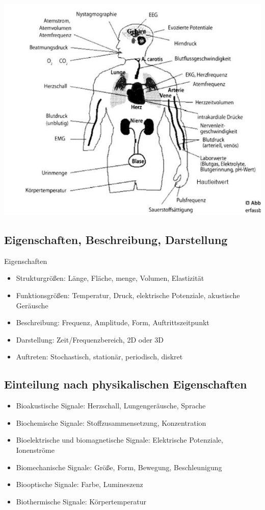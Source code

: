 \documentclass[a4paper,10pt,oneside]{article}
\begin{document}
\includegraphics[scale=0.65]{Grafiken/beispielbiosig.png}

\subsection{Eigenschaften, Beschreibung, Darstellung}
Eigenschaften
\begin{itemize}
	\item Strukturgrößen: Länge, Fläche, menge, Volumen, Elastizität
	\item Funktionsgrößen: Temperatur, Druck, elektrische Potenziale, akustische Geräusche
	\item Beschreibung: Frequenz, Amplitude, Form, Auftrittszeitpunkt
	\item Darstellung: Zeit/Frequenzbereich, 2D oder 3D
	\item Auftreten: Stochastisch, stationär, periodisch, diskret
\end{itemize}

\subsection{Einteilung nach physikalischen Eigenschaften}
\begin{itemize}
	\item Bioakustische Signale: Herzschall, Lungengeräusche, Sprache
	\item Biochemische Signale: Stoffzusammensetzung, Konzentration
	\item Bioelektrische und biomagnetische Signale: Elektrische Potenziale, Ionenströme
	\item Biomechanische Signale: Größe, Form, Bewegung, Beschleunigung
	\item Biooptische Signale: Farbe, Lumineszenz
	\item Biothermische Signale: Körpertemperatur
\end{itemize}
\end{document}
